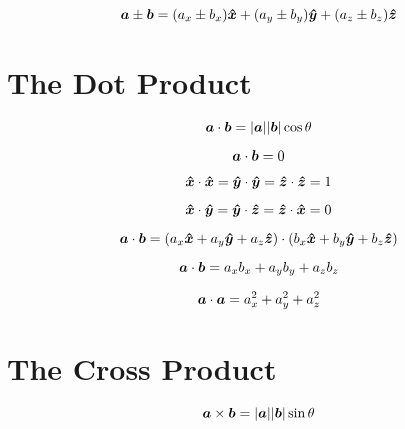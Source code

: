 \begin{equation*}
    \boldsymbol{a} \pm \boldsymbol{b} =
    (a_x \pm b_x)\boldsymbol{\hat{x}} + 
    (a_y \pm b_y)\boldsymbol{\hat{y}} + 
    (a_z \pm b_z)\boldsymbol{\hat{z}}
\end{equation*}

\section{The Dot Product}

\begin{equation*}
    \boldsymbol{a} \cdot \boldsymbol{b}= |\boldsymbol{a}||\boldsymbol{b}| \cos \theta
\end{equation*}

\begin{equation*}
    \boldsymbol{a} \cdot \boldsymbol{b} = 0
\end{equation*}

\begin{equation*}
    \boldsymbol{\hat{x}} \cdot \boldsymbol{\hat{x}} = 
    \boldsymbol{\hat{y}} \cdot \boldsymbol{\hat{y}} = 
    \boldsymbol{\hat{z}} \cdot \boldsymbol{\hat{z}} = 1
\end{equation*}

\begin{equation*}
    \boldsymbol{\hat{x}} \cdot \boldsymbol{\hat{y}} = 
    \boldsymbol{\hat{y}} \cdot \boldsymbol{\hat{z}} = 
    \boldsymbol{\hat{z}} \cdot \boldsymbol{\hat{x}} = 0
\end{equation*}

\begin{equation*}
    \boldsymbol{a} \cdot \boldsymbol{b} = 
    (a_x\boldsymbol{\hat{x}} + a_y\boldsymbol{\hat{y}} + a_z\boldsymbol{\hat{z}}) 
    \cdot (b_x\boldsymbol{\hat{x}} + b_y\boldsymbol{\hat{y}} + b_z\boldsymbol{\hat{z}})
\end{equation*}

\begin{equation*}
    \boldsymbol{a} \cdot \boldsymbol{b} = a_xb_x + a_yb_y + a_zb_z
\end{equation*}
    
\begin{equation*}
    \boldsymbol{a} \cdot \boldsymbol{a} = a_x^2 + a_y^2 + a_z^2
\end{equation*}

\section{The Cross Product}

\begin{equation*}
    \boldsymbol{a} \times \boldsymbol{b}= |\boldsymbol{a}||\boldsymbol{b}| \sin \theta
\end{equation*}

